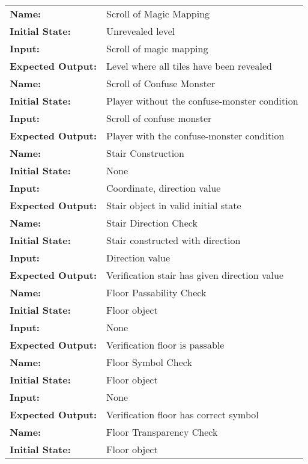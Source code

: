\documentclass[12pt, titlepage]{article}
\begin{document}
\begin{center}
\begin{longtable}{ l | p{10cm} }
				\hline
				\rule{0pt}{1.5em}\textbf{Name:} & Scroll of Magic Mapping\\
				\textbf{Initial State:} & Unrevealed level\\
				\textbf{Input:} & Scroll of magic mapping\\
				\textbf{Expected Output:} & Level where all tiles have been revealed\\[0.6em]
				\hline
				\rule{0pt}{1.5em}\textbf{Name:} & Scroll of Confuse Monster\\
				\textbf{Initial State:} & Player without the confuse-monster condition\\
				\textbf{Input:} & Scroll of confuse monster\\
				\textbf{Expected Output:} & Player with the confuse-monster condition\\[0.6em]
				\hline
				\rule{0pt}{1.5em}\textbf{Name:} & Stair Construction\\
				\textbf{Initial State:} & None\\
				\textbf{Input:} & Coordinate, direction value\\
				\textbf{Expected Output:} & Stair object in valid initial state\\[0.6em]
				\hline
				\rule{0pt}{1.5em}\textbf{Name:} & Stair Direction Check\\
				\textbf{Initial State:} & Stair constructed with direction\\
				\textbf{Input:} & Direction value\\
				\textbf{Expected Output:} & Verification stair has given direction value\\[0.6em]
				\hline
				\rule{0pt}{1.5em}\textbf{Name:} & Floor Passability Check\\
				\textbf{Initial State:} & Floor object\\
				\textbf{Input:} & None\\
				\textbf{Expected Output:} & Verification floor is passable\\[0.6em]
				\hline
				\rule{0pt}{1.5em}\textbf{Name:} & Floor Symbol Check\\
				\textbf{Initial State:} & Floor object\\
				\textbf{Input:} & None\\
				\textbf{Expected Output:} & Verification floor has correct symbol\\[0.6em]
				\hline
				\rule{0pt}{1.5em}\textbf{Name:} & Floor Transparency Check\\
				\textbf{Initial State:} & Floor object\\

\end{longtable}
\end{center}
\end{document}

